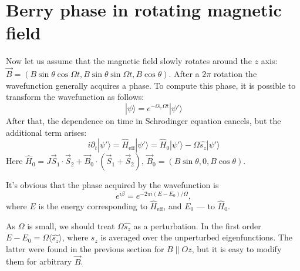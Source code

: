 \documentclass{article}
\begin{document}
\section{Berry phase in rotating magnetic field}
Now let us assume that the magnetic field slowly rotates around the $z$ axis: 
$\vec{B} = (B\sin\theta \cos{\Omega t}, B\sin\theta \sin{\Omega t}, B\cos\theta)$. After
a $2\pi$ rotation the wavefunction generally acquires a phase. To compute this phase,
it is possible to transform the wavefunction as follows:
\begin{equation}
   |\psi \rangle = e^{-i\hat{s}_z \Omega t} |\psi' \rangle
\end{equation}
After that, the dependence on time in Schrodinger equation cancels, but the additional term
arises:
\begin{equation}
    i\partial_t |\psi'\rangle = \hat{H}_\mathrm{eff}|\psi'\rangle = 
    \hat{H}_0|\psi'\rangle - \Omega\hat{s_z}|\psi'\rangle
\end{equation}
Here $\hat{H}_0 = J\vec{S}_1\cdot\vec{S}_2 + \vec{B}_0\cdot(\vec{S}_1+\vec{S}_2)$, 
$\vec{B}_0 = (B\sin\theta, 0, B\cos\theta)$.

It's obvious that the phase acquired by the wavefunction is 
\begin{equation}
   e^{i\beta} =  e^{-2\pi i(E - E_0)/\Omega},
\end{equation}
where $E$ is
the energy corresponding to $\hat{H}_\mathrm{eff}$, and $E_0$ --- to $\hat{H}_0$.

As $\Omega$ is small, we should treat $\Omega \hat{s_z}$ as a perturbation. In the first order
$E - E_0 = \Omega\langle \hat{s_z} \rangle$, where $s_z$ is averaged over the unperturbed
eigenfunctions. The latter were found in the previous section for $B \parallel Oz$, but 
it is easy to modify them for arbitrary $\vec{B}$.
\end{document}
